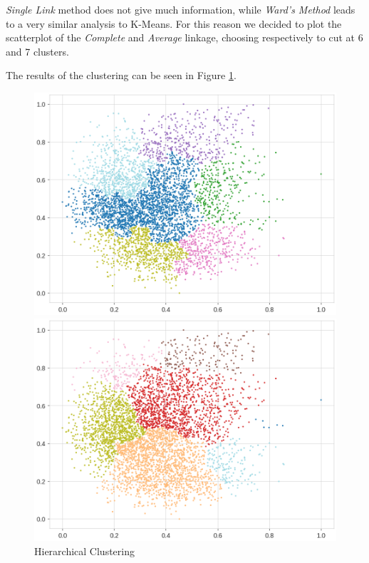 \documentclass[a4paper,11pt,dvipsnames]{article}
\begin{document}
 \textit{Single Link} method does not give much information, while \textit{Ward's Method} leads to a very similar analysis to K-Means. For this reason we decided to plot the scatterplot of the \textit{Complete} and \textit{Average} linkage, choosing respectively to cut at 6 and 7 clusters.
 
 The results of the clustering can be seen in Figure \ref{fig:hierach}.
 
\begin{figure}[h]
    \centering
    \begin{minipage}{0.49\textwidth}
    \centering
        \includegraphics[width=\textwidth]{complete.png}
    \end{minipage}
    \hfill
        \begin{minipage}{0.49\textwidth}
        \centering
        \includegraphics[width=\textwidth]{average.png}
    \end{minipage}
    \caption{Hierarchical Clustering}
    \label{fig:hierach}
\end{figure}
\end{document}
